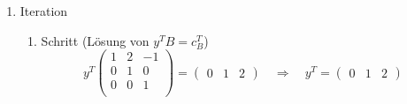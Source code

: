 \documentclass[a4paper]{scrartcl}
\begin{document}
\begin{enumerate}[label=\bfseries\arabic*.]
\begin{enumerate}
\begin{enumerate}[1.]
                    \item Iteration
                        \begin{enumerate}[1.]
                            \item Schritt (Lösung von $y^TB = c_B^T$)
                                \begin{equation}
                                    y^T
                                    \begin{pmatrix}
                                        1 & 2 & -1 \\
                                        0 & 1 & 0 \\
                                        0 & 0 & 1 \\
                                    \end{pmatrix}
                                    =
                                    \begin{pmatrix}
                                        0 & 1 & 2
                                    \end{pmatrix}
                                    \quad\Rightarrow\quad
                                    y^T =
                                    \begin{pmatrix}
                                        0 & 1 & 2
                                    \end{pmatrix}
                                \end{equation}
                                

\end{enumerate}
\end{enumerate}
\end{enumerate}
\end{enumerate}
\end{document}
